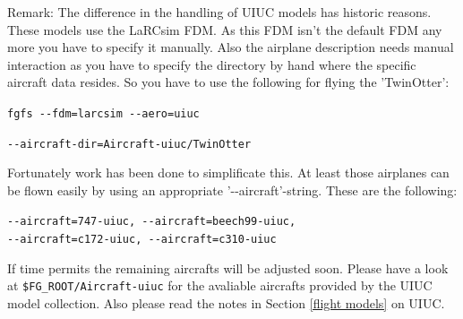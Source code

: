 Remark:  The difference in the handling of UIUC models has historic reasons.  These models use the LaRCsim FDM. As this FDM isn't the default
FDM any more you have to specify it manually. Also the airplane description
needs manual interaction as you have to specify the directory by hand where
the specific aircraft data resides. So you have to use the following for
flying the 'TwinOtter':
\medskip

\noindent
\texttt{fgfs -$ $-fdm=larcsim -$ $-aero=uiuc} 

\noindent
\texttt{-$ $-aircraft-dir=Aircraft-uiuc/TwinOtter}
\medskip

\noindent
Fortunately work has been done to simplificate this. At least those airplanes
can be flown easily by using an appropriate '-$ $-aircraft'-string. These are
the following:
\medskip

\noindent
\texttt{-$ $-aircraft=747-uiuc, -$ $-aircraft=beech99-uiuc,}\\
\texttt{-$ $-aircraft=c172-uiuc, -$ $-aircraft=c310-uiuc}
\medskip

If time permits the remaining aircrafts will be adjusted soon. Please have a
look at \texttt{{\$}FG\_ROOT/Aircraft-uiuc} for the avaliable aircrafts provided by the UIUC model collection. Also please read the notes in Section \ref{flight models} on UIUC.

